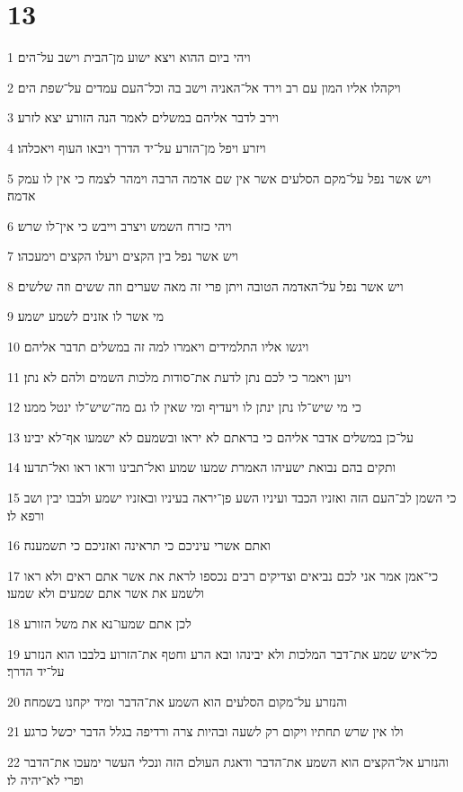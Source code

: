 \chapter{13}

\par 1 ויהי ביום ההוא ויצא ישוע מן־הבית וישב על־הים׃
\par 2 ויקהלו אליו המון עם רב וירד אל־האניה וישב בה וכל־העם עמדים על־שפת הים׃
\par 3 וירב לדבר אליהם במשלים לאמר הנה הזורע יצא לזרע׃
\par 4 ויזרע ויפל מן־הזרע על־יד הדרך ויבאו העוף ויאכלהו׃
\par 5 ויש אשר נפל על־מקם הסלעים אשר אין שם אדמה הרבה וימהר לצמח כי אין לו עמק אדמה׃
\par 6 ויהי כזרח השמש ויצרב וייבש כי אין־לו שרש׃
\par 7 ויש אשר נפל בין הקצים ויעלו הקצים וימעכהו׃
\par 8 ויש אשר נפל על־האדמה הטובה ויתן פרי זה מאה שערים וזה ששים וזה שלשים׃
\par 9 מי אשר לו אזנים לשמע ישמע׃
\par 10 ויגשו אליו התלמידים ויאמרו למה זה במשלים תדבר אליהם׃
\par 11 ויען ויאמר כי לכם נתן לדעת את־סודות מלכות השמים ולהם לא נתן׃
\par 12 כי מי שיש־לו נתן ינתן לו ויעדיף ומי שאין לו גם מה־שיש־לו ינטל ממנו׃
\par 13 על־כן במשלים אדבר אליהם כי בראתם לא יראו ובשמעם לא ישמעו אף־לא יבינו׃
\par 14 ותקים בהם נבואת ישעיהו האמרת שמעו שמוע ואל־תבינו וראו ראו ואל־תדעו׃
\par 15 כי השמן לב־העם הזה ואזניו הכבד ועיניו השע פן־יראה בעיניו ובאזניו ישמע ולבבו יבין ושב ורפא לו׃
\par 16 ואתם אשרי עיניכם כי תראינה ואזניכם כי תשמענה׃
\par 17 כי־אמן אמר אני לכם נביאים וצדיקים רבים נכספו לראת את אשר אתם ראים ולא ראו ולשמע את אשר אתם שמעים ולא שמעו׃
\par 18 לכן אתם שמעו־נא את משל הזורע׃
\par 19 כל־איש שמע את־דבר המלכות ולא יבינהו ובא הרע וחטף את־הזרוע בלבבו הוא הנזרע על־יד הדרך׃
\par 20 והנזרע על־מקום הסלעים הוא השמע את־הדבר ומיד יקחנו בשמחה׃
\par 21 ולו אין שרש תחתיו ויקום רק לשעה ובהיות צרה ורדיפה בגלל הדבר יכשל כרגע׃
\par 22 והנזרע אל־הקצים הוא השמע את־הדבר ודאגת העולם הזה ונכלי העשר ימעכו את־הדבר ופרי לא־יהיה לו׃
